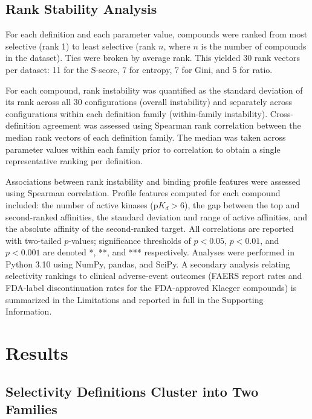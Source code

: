\documentclass[journal=jcisd8,manuscript=article]{achemso}
\begin{document}
\subsection{Rank Stability Analysis}
\label{sec:methods:stability}

For each definition and each parameter value, compounds were ranked from most
selective (rank 1) to least selective (rank $n$, where $n$ is the number of
compounds in the dataset).
Ties were broken by average rank.
This yielded 30 rank vectors per dataset: 11 for the S-score, 7 for entropy,
7 for Gini, and 5 for ratio.

For each compound, rank instability was quantified as the standard deviation
of its rank across all 30 configurations (overall instability) and separately
across configurations within each definition family (within-family
instability).
Cross-definition agreement was assessed using Spearman rank correlation
between the median rank vectors of each definition family.
The median was taken across parameter values within each family prior to
correlation to obtain a single representative ranking per definition.

Associations between rank instability and binding profile features were
assessed using Spearman correlation.
Profile features computed for each compound included: the number of active
kinases ($\mathrm{p}K_d > 6$), the gap between the top and second-ranked
affinities, the standard deviation and range of active affinities, and the
absolute affinity of the second-ranked target.
All correlations are reported with two-tailed $p$-values; significance
thresholds of $p < 0.05$, $p < 0.01$, and $p < 0.001$ are denoted *, **, and
*** respectively.
Analyses were performed in Python 3.10 using NumPy, pandas, and
SciPy.\cite{NumPy,pandas,SciPy}
A secondary analysis relating selectivity rankings to clinical adverse-event
outcomes (FAERS report rates and FDA-label discontinuation rates for the
FDA-approved Klaeger compounds) is summarized in the Limitations and reported
in full in the Supporting Information.

\section{Results}
\label{sec:results}

\subsection{Selectivity Definitions Cluster into Two Families}
\label{sec:results:families}
\end{document}
